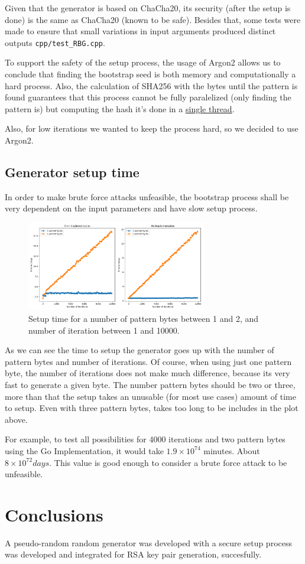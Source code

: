 \documentclass{article} %
\begin{document}
Given that the generator is based on ChaCha20, its security (after the setup is done) is the same as ChaCha20 (known to be safe). Besides that, some tests were made to ensure that small variations in input arguments produced distinct outputs \texttt{cpp/test\_RBG.cpp}.

To support the safety of the setup process, the usage of Argon2 allows us to conclude that finding the bootstrap seed is both memory and computationally a hard process. Also, the calculation of SHA256 with the bytes until the pattern is found guarantees that this process cannot be fully paralelized (only finding the pattern is) but computing the hash it's done in a \href{https://stackoverflow.com/questions/24088295/can-sha1-sha-256-sha-512-be-broken-up-to-run-across-multiple-cores-threads}{single thread}.

Also, for low iterations we wanted to keep the process hard, so we decided to use Argon2.
\subsection{Generator setup time}
In order to make brute force attacks unfeasible, the bootstrap process shall be very dependent on the input parameters and have slow setup process.

\begin{figure}[H]
  \label{figure:apache_headers}
  \centering
  \includegraphics[width=0.7\textwidth]{assets/randgen_plot1.png}
  \caption{Setup time for a number of pattern bytes between 1 and 2, and number of iteration between 1 and 10000.}
\end{figure}

As we can see the time to setup the generator goes up with the number of pattern bytes and number of iterations. Of course, when using 
just one pattern byte, the number of iterations does not make much difference, because its very fast to generate a given byte. The number pattern bytes
should be two or three, more than that the setup takes an unusable (for most use cases) amount of time to setup. Even with three pattern bytes, takes too long
to be includes in the plot above.

For example, to test all possibilities for 4000 iterations and two pattern bytes using the Go Implementation, it would take $1.9 \times 10^{74}$ minutes. About $8 \times 10^{72} days$.
This value is good enough to consider a brute force attack to be unfeasible.


\section{Conclusions}
A pseudo-random random generator was developed with a secure setup process was developed and integrated for RSA key pair generation, succesfully.
\end{document}
